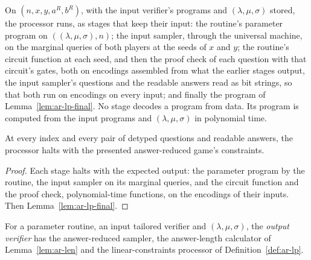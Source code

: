\begin{definition}
\label{def:ar-lp}
\leanok
On $(n, x, y, a^R, b^R)$, with the input verifier's programs and $(\lambda, \mu, \sigma)$ stored,
the processor runs, as stages that keep their input: the routine's parameter program on
$((\lambda, \mu, \sigma), n)$; the input sampler, through the universal machine, on the marginal
queries of both players at the seeds of $x$ and $y$; the routine's circuit function at each
seed, and then the proof check of each question with that circuit's gates, both on encodings
assembled from what the earlier stages output, the input sampler's questions and the readable
answers read as bit strings, so that both run on encodings on every input; and finally the
program of Lemma~\ref{lem:ar-lp-final}. No stage decodes a program from data. Its program is
computed from the input programs and $(\lambda, \mu, \sigma)$ in polynomial time.
\end{definition}

\begin{lemma}
\label{lem:ar-lp}
\leanok
At every index and every pair of detyped questions and readable answers, the processor halts
with the presented answer-reduced game's constraints.
\end{lemma}

\begin{proof}
\leanok
Each stage halts with the expected output: the parameter program by the routine, the input
sampler on its marginal queries, and the circuit function and the proof check, polynomial-time
functions, on the encodings of their inputs. Then Lemma~\ref{lem:ar-lp-final}.
\end{proof}

\begin{definition}
\label{def:ar-output}
\leanok
For a parameter routine, an input tailored verifier and $(\lambda, \mu, \sigma)$, the
\emph{output verifier} has the answer-reduced sampler, the answer-length calculator of
Lemma~\ref{lem:ar-len} and the linear-constraints processor of Definition~\ref{def:ar-lp}.
\end{definition}

